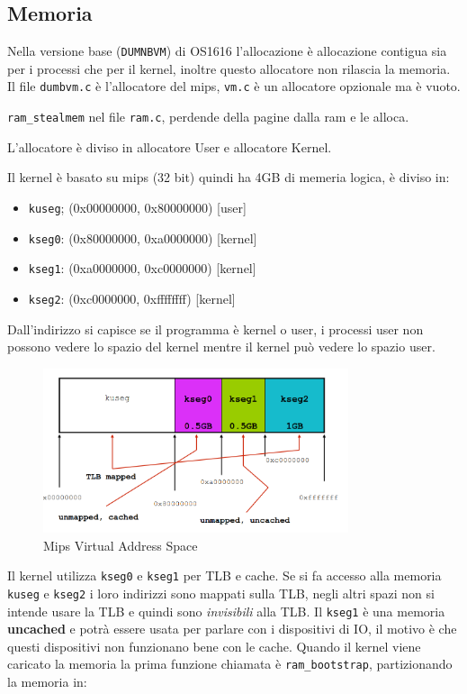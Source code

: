 \documentclass[12pt]{article}
\begin{document}
\subsection{Memoria}
Nella versione base (\texttt{DUMNBVM}) di OS1616 l'allocazione  \`e allocazione contigua sia per i processi che per il kernel, inoltre questo allocatore non rilascia la memoria. Il file \texttt{dumbvm.c} \`e l'allocatore del mips, \texttt{vm.c} \`e un allocatore opzionale ma \`e vuoto.

\texttt{ram\_stealmem} nel file \texttt{ram.c}, perdende della pagine dalla ram e le alloca.

L'allocatore \`e diviso in allocatore User e allocatore Kernel.

Il kernel \`e basato su mips (32 bit) quindi ha 4GB di memeria logica, \`e diviso in:
\begin{itemize}
  \item \texttt{kuseg}; (0x00000000, 0x80000000) [user]
  \item \texttt{kseg0}: (0x80000000, 0xa0000000) [kernel]
  \item \texttt{kseg1}: (0xa0000000, 0xc0000000) [kernel]
  \item \texttt{kseg2}: (0xc0000000, 0xffffffff) [kernel]
\end{itemize}
Dall'indirizzo si capisce se il programma \`e kernel o user, i processi user non possono vedere lo spazio del kernel mentre il kernel pu\`o vedere lo spazio user.
\begin{figure}[H]
  \centering
  \includegraphics[width=0.8\textwidth]{mips-virtual-address-space.png}
  \caption{Mips Virtual Address Space}
  \label{fig:mips-virtual-address-space}
\end{figure}
Il kernel utilizza \texttt{kseg0} e \texttt{kseg1} per TLB e cache. Se si fa accesso alla memoria \texttt{kuseg} e \texttt{kseg2} i loro indirizzi sono mappati sulla TLB, negli altri spazi non si intende usare la TLB e quindi sono \emph{invisibili} alla TLB. Il \texttt{kseg1} \`e una memoria \textbf{uncached} e potr\`a essere usata per parlare con i dispositivi di IO, il motivo \`e che questi dispositivi non funzionano bene con le cache. Quando il kernel viene caricato la memoria la prima funzione chiamata \`e \texttt{ram\_bootstrap}, partizionando la memoria in:
\end{document}
